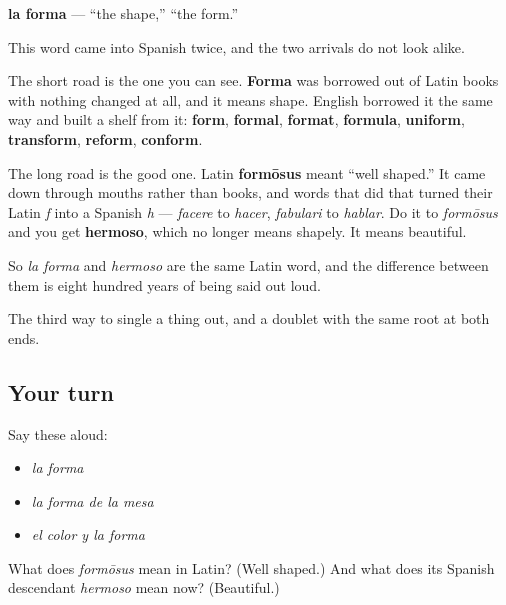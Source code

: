 \begin{cousinweb}
\textbf{la forma} — \textquotedblleft{}the shape,\textquotedblright{} \textquotedblleft{}the form.\textquotedblright{}

This word came into Spanish twice, and the two arrivals do not look alike.

The short road is the one you can see. \textbf{Forma} was borrowed out of Latin books with nothing changed at all, and it means shape. English borrowed it the same way and built a shelf from it: \textbf{form}, \textbf{formal}, \textbf{format}, \textbf{formula}, \textbf{uniform}, \textbf{transform}, \textbf{reform}, \textbf{conform}.

The long road is the good one. Latin \textbf{formōsus} meant \textquotedblleft{}well shaped.\textquotedblright{} It came down through mouths rather than books, and words that did that turned their Latin \emph{f} into a Spanish \emph{h} — \emph{facere} to \emph{hacer}, \emph{fabulari} to \emph{hablar}. Do it to \emph{formōsus} and you get \textbf{hermoso}, which no longer means shapely. It means beautiful.

So \emph{la forma} and \emph{hermoso} are the same Latin word, and the difference between them is eight hundred years of being said out loud.
\end{cousinweb}

\begin{grammarlens}[title={What you've built}]
The third way to single a thing out, and a doublet with the same root at both ends.
\end{grammarlens}

\subsection*{Your turn}
Say these aloud:

\begin{itemize}
\raggedright
  \item \emph{la forma}
  \item \emph{la forma de la mesa}
  \item \emph{el color y la forma}
\end{itemize}

\begin{tcolorbox}[breakable,colback=teal!4,colframe=teal!35!black,title={Before you move on}]
What does \emph{formōsus} mean in Latin? (Well shaped.) And what does its Spanish descendant \emph{hermoso} mean now? (Beautiful.)
\end{tcolorbox}
